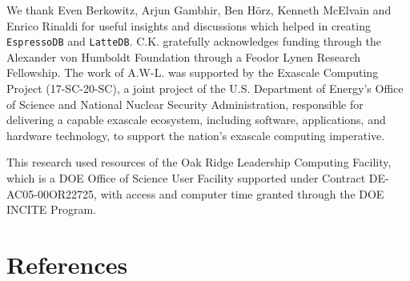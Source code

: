 We thank Even Berkowitz, Arjun Gambhir, Ben Hörz, Kenneth McElvain and
Enrico Rinaldi for useful insights and discussions which helped in
creating \texttt{EspressoDB} and \texttt{LatteDB}. C.K. gratefully
acknowledges funding through the Alexander von Humboldt Foundation
through a Feodor Lynen Research Fellowship. The work of A.W-L. was
supported by the Exascale Computing Project (17-SC-20-SC), a joint
project of the U.S. Department of Energy's Office of Science and
National Nuclear Security Administration, responsible for delivering a
capable exascale ecosystem, including software, applications, and
hardware technology, to support the nation's exascale computing
imperative.

This research used resources of the Oak Ridge Leadership Computing
Facility, which is a DOE Office of Science User Facility supported under
Contract DE-AC05-00OR22725, with access and computer time granted
through the DOE INCITE Program.

\hypertarget{references}{%
\section{References}\label{references}}
